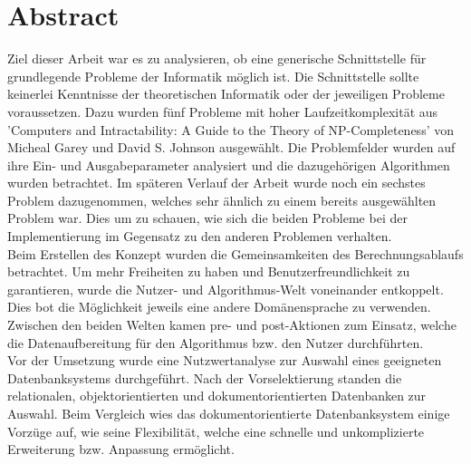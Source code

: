 %
%

\thispagestyle{empty}


\newpage
\thispagestyle{empty}
\chapter*{Abstract}\label{abstract}
Ziel dieser Arbeit war es zu analysieren, ob eine generische Schnittstelle für grundlegende Probleme der Informatik möglich ist. Die Schnittstelle sollte keinerlei Kenntnisse 
der theoretischen Informatik oder der jeweiligen Probleme voraussetzen. Dazu wurden fünf Probleme mit hoher Laufzeitkomplexität aus 'Computers and Intractability: A Guide to the Theory of 
NP-Completeness' von Micheal Garey und David S. Johnson ausgewählt. Die Problemfelder wurden auf ihre Ein- und Ausgabeparameter analysiert und die dazugehörigen 
Algorithmen wurden betrachtet. Im späteren Verlauf der Arbeit wurde noch ein sechstes Problem dazugenommen, welches sehr ähnlich zu einem bereits ausgewählten Problem war. Dies 
um zu schauen, wie sich die beiden Probleme bei der Implementierung im Gegensatz zu den anderen Problemen verhalten.\\

Beim Erstellen des Konzept wurden die Gemeinsamkeiten des Berechnungsablaufs betrachtet. Um mehr Freiheiten zu haben und Benutzerfreundlichkeit zu garantieren, wurde die Nutzer- und 
Algorithmus-Welt voneinander entkoppelt. Dies bot die Möglichkeit jeweils eine andere Domänensprache zu verwenden. Zwischen den beiden Welten kamen pre- und post-Aktionen zum Einsatz, 
welche die Datenaufbereitung für den Algorithmus bzw. den Nutzer durchführten.\\

Vor der Umsetzung wurde eine Nutzwertanalyse zur Auswahl eines geeigneten Datenbanksystems durchgeführt. Nach der Vorselektierung standen die relationalen, objektorientierten und 
dokumentorientierten Datenbanken zur Auswahl. Beim Vergleich wies das dokumentorientierte Datenbanksystem einige Vorzüge auf, wie seine Flexibilität, welche eine schnelle und unkomplizierte 
Erweiterung bzw. Anpassung ermöglicht.\\

